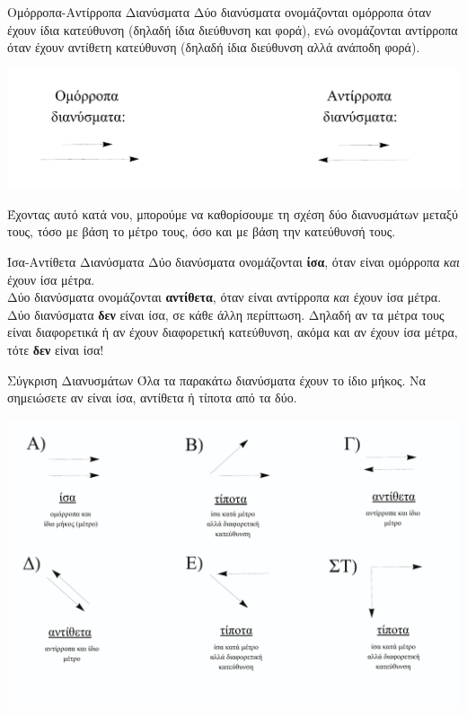 \begin{orismos}{Ομόρροπα-Αντίρροπα Διανύσματα}
Δύο διανύσματα ονομάζονται ομόρροπα όταν έχουν ίδια κατεύθυνση (δηλαδή ίδια διεύθυνση και φορά), ενώ ονομάζονται αντίρροπα όταν έχουν αντίθετη κατεύθυνση (δηλαδή ίδια διεύθυνση αλλά ανάποδη φορά).
\begin{center}
\includegraphics[width=0.95\linewidth]{images/dianismata2.pdf}
\end{center}
\end{orismos}
\vspace{2mm}
Έχοντας αυτό κατά νου, μπορούμε να καθορίσουμε τη σχέση δύο διανυσμάτων μεταξύ τους, τόσο με βάση το μέτρο τους, όσο και με βάση την κατεύθυνσή τους.
\vspace{2mm}
\begin{orismos}{Ίσα-Αντίθετα Διανύσματα}
Δύο διανύσματα ονομάζονται \textbf{ίσα}, όταν είναι ομόρροπα \textit{και} έχουν ίσα μέτρα.\\
Δύο διανύσματα ονομάζονται \textbf{αντίθετα}, όταν είναι αντίρροπα \textit{και} έχουν ίσα μέτρα.
\tcblower
Δύο διανύσματα \textbf{δεν} είναι ίσα, σε κάθε άλλη περίπτωση. Δηλαδή αν τα μέτρα τους είναι διαφορετικά ή αν έχουν διαφορετική κατεύθυνση, ακόμα και αν έχουν ίσα μέτρα, τότε \textbf{δεν} είναι ίσα!
\end{orismos}
\vspace{2mm}
\begin{prdgm}{Σύγκριση Διανυσμάτων}
Όλα τα παρακάτω διανύσματα έχουν το ίδιο μήκος. Να σημειώσετε αν είναι ίσα, αντίθετα ή τίποτα από τα δύο.
\tcblower
\begin{center}
\includegraphics[width=0.95\linewidth]{images/dianismata1.pdf}
\end{center}
\end{prdgm}
%
%
%
%
%
%
\clearpage
